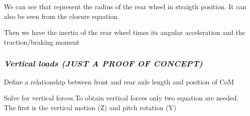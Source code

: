 \documentclass{article}
\begin{document}
\begin{maplegroup}
\begin{Maple Normal}{
We can see that
represent the radius of the rear wheel in straigth position. It can also be seen from the closure equation.}\end{Maple Normal}

\begin{Maple Normal}{
Then we have the inertia of the rear wheel times its angular acceleration and the traction/braking moment
}\end{Maple Normal}
\end{maplegroup}
\subsubsection{\textbf{\textit{Vertical loads (JUST A PROOF OF CONCEPT)}}}
\begin{maplegroup}
\begin{Maple Normal}{
Define a relationship between front and rear axle length and position of CoM}\end{Maple Normal}

\end{maplegroup}
\begin{maplegroup}
\begin{mapleinput}
\end{mapleinput}
\mapleresult
\begin{maplelatex}
\end{maplelatex}
\end{maplegroup}
\begin{maplegroup}
\begin{Maple Normal}{
Solve for vertical forces.To obtain vertical forces only two equation are needed. The first is the vertical motion (Z) and pitch rotation (Y)}\end{Maple Normal}

\end{maplegroup}
\begin{maplegroup}
\begin{mapleinput}
\end{mapleinput}
\mapleresult
\begin{maplelatex}
\end{maplelatex}
\end{maplegroup}
\end{document}
